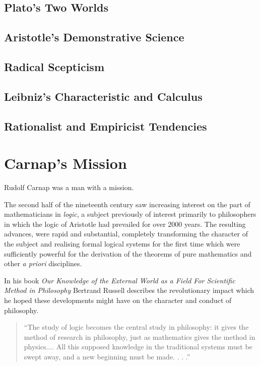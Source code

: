 \section{Plato's Two Worlds}

\section{Aristotle's Demonstrative Science}

\section{Radical Scepticism} 

\section{Leibniz's Characteristic and Calculus}

\section{Rationalist and Empiricist Tendencies}


\chapter{Carnap's Mission}

Rudolf Carnap was a man with a mission.

The second half of the nineteenth century saw increasing interest on the part of mathematicians
in \emph{logic}, a subject previously of interest primarily to philosophers
in which the logic of Aristotle had prevailed for over 2000 years.
The resulting advances, were rapid and substantial, completely transforming the character
of the subject and realising formal logical systems for the first time which were sufficiently powerful
for the derivation of the theorems of pure mathematics and other \emph{a priori} disciplines.  

In his book \emph{Our Knowledge of the External World as a Field For Scientific Method in Philosophy} \cite{russell21} Bertrand Russell describes the revolutionary impact which he hoped these developments might have on the character and conduct of philosophy.

\begin{quote}
``The study of logic becomes the central study in philosophy: it gives the method of research in philosophy, just as mathematics gives the method in physics....	
All this supposed knowledge in the traditional systems must be swept away, and a new beginning must be made. . . .''
\end{quote}

